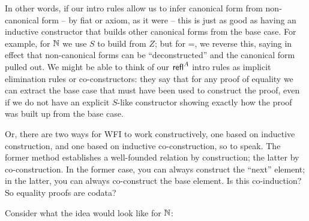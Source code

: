 \documentclass{article}
\begin{document}
\begin{remark}
  In other words, if our intro rules allow us to infer canonical form
  from non-canonical form -- by fiat or axiom, as it were -- this is
  just as good as having an inductive constructor that builds other
  canonical forms from the base case.  For example, for \(\mathbb{N}\) we
  use \(S\) to build from \(Z\); but for =, we reverse this, saying in
  effect that non-canonical forms can be ``deconstructed'' and the
  canonical form pulled out.  We might be able to think of our
  \(\textsf{refl}^A\) intro rules as implicit elimination rules or
  co-constructors: they say that for any proof of equality we can
  extract the base case that must have been used to construct the
  proof, even if we do not have an explicit \(S\)-like constructor
  showing exactly how the proof was built up from the base case.
\end{remark}

\begin{remark}
  Or, there are two ways for WFI to work constructively, one based on
  inductive construction, and one based on inductive co-construction,
  so to speak.  The former method establishes a well-founded relation
  by construction; the latter by co-construction.  In the former case,
  you can always construct the ``next'' element; in the latter, you
  can always co-construct the base element.  Is this co-induction?  So
  equality proofs are codata?
\end{remark}

\medskip

Consider what the idea would look like for \(\mathbb{N}\):

\medskip
\end{document}
